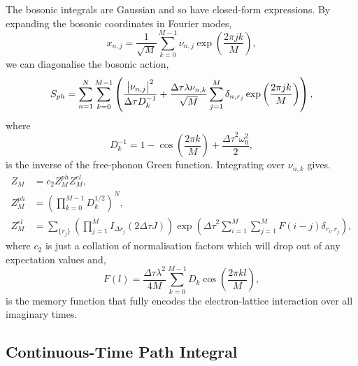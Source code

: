 The bosonic integrals are Gaussian and so have closed-form expressions. By expanding the bosonic coordinates in Fourier modes,
\begin{equation}
    x_{n,j} = \frac{1}{\sqrt{M}} \sum_{k=0}^{M-1} \nu_{n,j} \exp\left( \frac{2\pi j k}{M} \right) ,
\end{equation}
we can diagonalise the bosonic action,
\begin{equation}
    S_{ph} = \sum_{n=1}^N \sum_{k=0}^{M-1} \left( \frac{\abs{\nu_{n,j}}^2}{\Delta\tau D_k^{-1}} + \frac{\Delta\tau \lambda \nu_{n,k}}{\sqrt{M}} \sum_{j=1}^M \delta_{n,r_j} \exp\left(\frac{2\pi j k}{M}\right) \right) ,
\end{equation}
where 
\begin{equation}
    D_k^{-1} = 1 - \cos\left(\frac{2\pi k}{M} \right) + \frac{{\Delta\tau}^2 \omega_0^2}{2} ,
\end{equation}
is the inverse of the free-phonon Green function. Integrating over $\nu_{n,k}$ gives.
\begin{equation}
    \begin{aligned}
        Z_M &= c_2 Z^{ph}_M Z_M^{el} , \\
        Z^{ph}_M &= \left( \prod_{k=0}^{M-1} D^{1/2}_k \right)^N , \\
        Z^{el}_M &= \sum_{\{r_j\}} \left( \prod_{j=1}^M I_{\Delta r_j}(2 \Delta\tau J) \right) \exp \left( {\Delta\tau}^2 \sum_{i=1}^M \sum_{j=1}^M F(i - j) \delta_{r_i, r_j} \right) ,
    \end{aligned}
\end{equation}
where $c_2$ is just a collation of normalisation factors which will drop out of any expectation values and,
\begin{equation}
    F(l) = \frac{\Delta\tau \lambda^2}{4M} \sum_{k=0}^{M-1} D_k \cos\left(\frac{2\pi k l }{M}\right) ,
\end{equation}
is the memory function that fully encodes the electron-lattice interaction over all imaginary times.

\subsection{Continuous-Time Path Integral}
\label{subsec:3-2-2}

